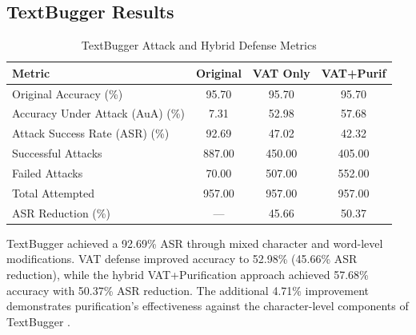 \documentclass[../main.tex]{subfiles}
\begin{document}
\subsection{TextBugger Results}
\begin{table}[H]
\caption{TextBugger Attack and Hybrid Defense Metrics}
\label{tab:textbugger_results}
\centering
\footnotesize
\begin{tabular}{@{\hspace{0.3cm}}l*{3}{S[table-format=3.2]}@{\hspace{0.3cm}}}
\toprule
\textbf{Metric} & {\textbf{Original}} & {\textbf{VAT Only}} & {\textbf{VAT+Purif}} \\
\midrule
Original Accuracy (\%) & 95.70 & 95.70 & 95.70 \\
Accuracy Under Attack (AuA) (\%) & 7.31 & 52.98 & 57.68 \\
Attack Success Rate (ASR) (\%) & 92.69 & 47.02 & 42.32 \\
Successful Attacks & 887.00 & 450.00 & 405.00 \\
Failed Attacks & 70.00 & 507.00 & 552.00 \\
Total Attempted & 957.00 & 957.00 & 957.00 \\
ASR Reduction (\%) & {---} & 45.66 & 50.37 \\
\bottomrule
\end{tabular}
\end{table}

\FloatBarrier

TextBugger achieved a 92.69\% ASR through mixed character and word-level modifications. VAT defense improved accuracy to 52.98\% (45.66\% ASR reduction), while the hybrid VAT+Purification approach achieved 57.68\% accuracy with 50.37\% ASR reduction. The additional 4.71\% improvement demonstrates purification's effectiveness against the character-level components of TextBugger \cite{li2018textbugger}.
\end{document}
